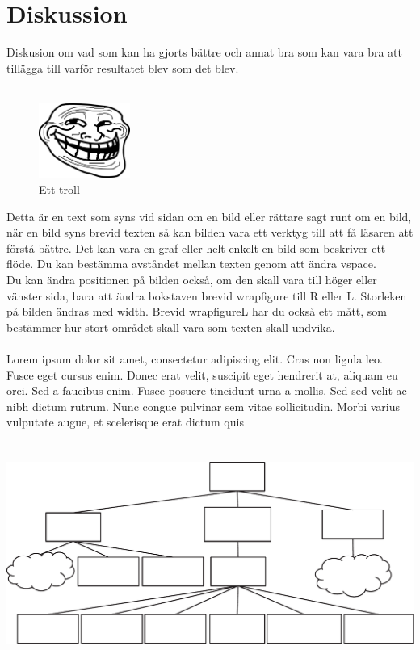 \section{Diskussion}
Diskusion om vad som kan ha gjorts bättre och annat bra som kan vara bra att tillägga till varför resultatet blev som det blev. \\ \\ 
\begin{figure}
\vspace{-10pt}
  \begin{center}
    \includegraphics[width=30mm]{Figurer/troll-face.png}
  \end{center}
  \vspace{-10pt}
  \caption{Ett troll}
  \vspace{-10pt}
\end{figure}

Detta är en text som syns vid sidan om en bild eller rättare sagt runt om en bild, när en bild syns brevid texten så kan bilden vara
ett verktyg till att få läsaren att förstå bättre. Det kan vara en graf eller helt enkelt en bild 
som beskriver ett flöde. Du kan bestämma avståndet mellan texten genom att ändra vspace. \\
Du kan ändra positionen på bilden också, om den skall vara till höger eller vänster sida, bara att ändra bokstaven brevid {wrapfigure} till  R eller L. Storleken på bilden ändras med width. Brevid {wrapfigure}{L} har du också ett mått, som bestämmer hur stort området skall vara som texten skall undvika.
\\ \\
Lorem ipsum dolor sit amet, consectetur adipiscing elit. Cras non ligula leo. Fusce eget cursus enim. Donec erat velit, suscipit eget hendrerit at, aliquam eu orci. Sed a faucibus enim. Fusce posuere tincidunt urna a mollis. Sed sed velit ac nibh dictum rutrum. Nunc congue pulvinar sem vitae sollicitudin. Morbi varius vulputate augue, et scelerisque erat dictum quis

\newpage
{}
\printbibliography


\appendix
\section{} \label{tree:bilaga}
\includegraphics[angle=90,width=8.5 cm]{Bilagor/bilaga-eps-converted-to.pdf}\centering

